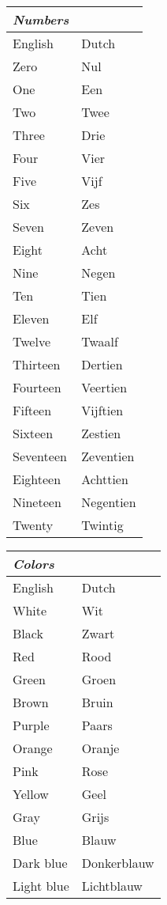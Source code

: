 \documentclass[letterpaper,11pt]{article}
\begin{document}
\begin{tabular}[t]{|l | l|}
    \hline
    \textit{Numbers} &           \\
    \hline
    English          & Dutch     \\
    \hline
    Zero             & Nul       \\
    One              & Een       \\
    Two              & Twee      \\
    Three            & Drie      \\
    Four             & Vier      \\
    Five             & Vijf      \\
    Six              & Zes       \\
    Seven            & Zeven     \\
    Eight            & Acht      \\
    Nine             & Negen     \\
    Ten              & Tien      \\
    Eleven           & Elf       \\
    Twelve           & Twaalf    \\
    Thirteen         & Dertien   \\
    Fourteen         & Veertien  \\
    Fifteen          & Vijftien  \\
    Sixteen          & Zestien   \\
    Seventeen        & Zeventien \\
    Eighteen         & Achttien  \\
    Nineteen         & Negentien \\
    Twenty           & Twintig   \\
    \hline
\end{tabular}
\begin{tabular}[t]{|l | l|}
    \hline
    \textit{Colors} &             \\
    \hline
    English         & Dutch       \\
    White           & Wit         \\
    Black           & Zwart       \\
    Red             & Rood        \\
    Green           & Groen       \\
    Brown           & Bruin       \\
    Purple          & Paars       \\
    Orange          & Oranje      \\
    Pink            & Rose        \\
    Yellow          & Geel        \\
    Gray            & Grijs       \\
    Blue            & Blauw       \\
    Dark blue       & Donkerblauw \\
    Light blue      & Lichtblauw  \\
    \hline
\end{tabular}    
\end{document}
